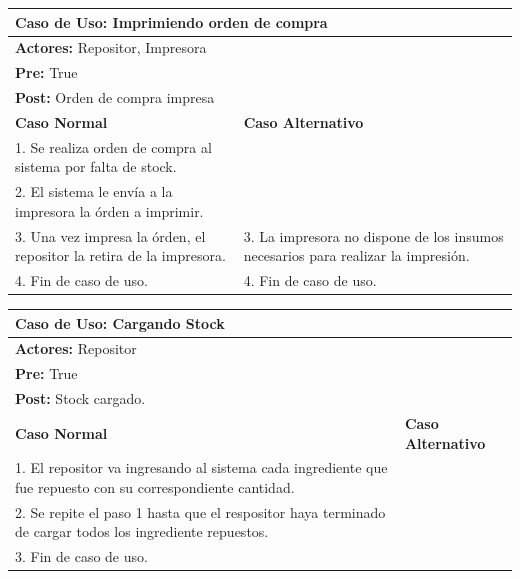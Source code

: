 \documentclass[a4paper,11pt] {article}
\begin{document}
\begin{center}
	\begin{tabular}{ | p{6.5cm} | p{6.5cm} | }
		\hline
			\multicolumn{2}{|l|}{\textbf{Caso de Uso:} Imprimiendo orden de compra} \\
		\hline
			\multicolumn{2}{|l|}{\textbf{Actores:} Repositor, Impresora} \\
		\hline
			\multicolumn{2}{|l|}{\textbf{Pre:} True} \\
		\hline
			\multicolumn{2}{|l|}{\textbf{Post:} Orden de compra impresa} \\
		\hline
		\textbf{Caso Normal} & \textbf{Caso Alternativo}	\\
		\hline
		1. Se realiza orden de compra al sistema por falta de stock. &	\\
		\hline
		2. El sistema le env\'ia a la impresora la \'orden a imprimir. &	\\
		\hline
		3. Una vez impresa la \'orden, el repositor la retira de la impresora. & 3. La impresora no dispone de los insumos necesarios para realizar la impresi\'on.	\\
		\hline
		4. Fin de caso de uso. & 4. Fin de caso de uso.	\\
		\hline
	\end{tabular}
\end{center}

\begin{center}
	\begin{tabular}{ | p{6.5cm} | p{6.5cm} | }
		\hline
			\multicolumn{2}{|l|}{\textbf{Caso de Uso:} Cargando Stock} \\
		\hline
			\multicolumn{2}{|l|}{\textbf{Actores:} Repositor} \\
		\hline
			\multicolumn{2}{|l|}{\textbf{Pre:} True} \\
		\hline
			\multicolumn{2}{|l|}{\textbf{Post:} Stock cargado.} \\
		\hline
		\textbf{Caso Normal} & \textbf{Caso Alternativo}	\\
		\hline
		1. El repositor va ingresando al sistema cada ingrediente que fue repuesto con su correspondiente cantidad. &	\\
		\hline
		2. Se repite el paso 1 hasta que el respositor haya terminado de cargar todos los ingrediente repuestos. &	\\
		\hline
		3. Fin de caso de uso. &	\\
		\hline
	\end{tabular}
\end{center}
\end{document}
